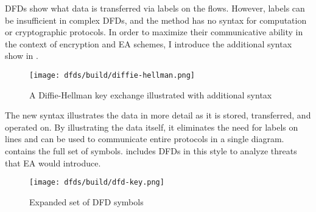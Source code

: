 \Acp{DFD} show what data is transferred via labels on the flows. However, labels can be insufficient in complex
\acp{DFD}, and the method has no syntax for computation or cryptographic protocols. In order to maximize their
communicative ability in the context of encryption and \acl{EA} schemes, I introduce the additional syntax show in
.

\begin{figure}[h]
    \centering\CaptionFontSize
    \texttt{[image: dfds/build/diffie-hellman.png]}
    \caption{A Diffie-Hellman key exchange illustrated with additional syntax}
    \label{fig-dfd-dh-updated}
\end{figure}

The new syntax illustrates the data in more detail as it is stored, transferred, and operated on. By illustrating the
data itself, it eliminates the need for labels on lines and can be used to communicate entire protocols in a single
diagram.  contains the full set of symbols.  includes \acp{DFD} in this
style to analyze threats that EA would introduce.

\begin{figure}[t]
    \centering\CaptionFontSize
    \texttt{[image: dfds/build/dfd-key.png]}
    \caption{Expanded set of DFD symbols}
    \label{fig-dfd-key}
\end{figure}
